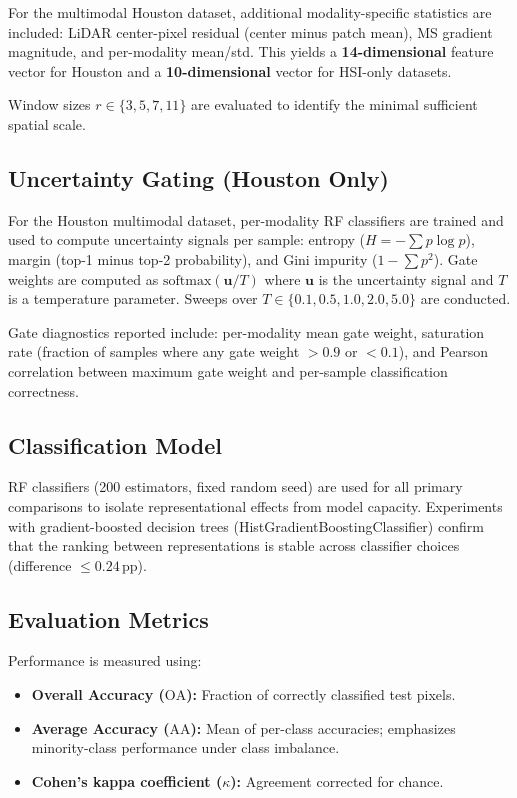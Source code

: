 \documentclass[journal]{IEEEtran}
\newcommand{\pp}{\,\text{pp}}
\newcommand{\OA}{\ensuremath{\mathrm{OA}}}
\newcommand{\Acc}{\ensuremath{\mathrm{AA}}}  %
\begin{document}
For the multimodal Houston dataset, additional modality-specific
statistics are included: LiDAR center-pixel residual (center minus
patch mean), MS gradient magnitude, and per-modality mean/std. This
yields a \textbf{14-dimensional} feature vector for Houston and a
\textbf{10-dimensional} vector for HSI-only datasets.

Window sizes $r \in \{3, 5, 7, 11\}$ are evaluated to identify the
minimal sufficient spatial scale.

\subsection{Uncertainty Gating (Houston Only)}

For the Houston multimodal dataset, per-modality RF classifiers are
trained and used to compute uncertainty signals per sample: entropy
($H = -\sum p \log p$), margin (top-1 minus top-2 probability), and
Gini impurity ($1 - \sum p^2$). Gate weights are computed as
$\mathrm{softmax}(\mathbf{u}/T)$ where $\mathbf{u}$ is the
uncertainty signal and $T$ is a temperature parameter. Sweeps over
$T \in \{0.1, 0.5, 1.0, 2.0, 5.0\}$ are conducted.

Gate diagnostics reported include: per-modality mean gate weight,
saturation rate (fraction of samples where any gate weight $> 0.9$
or $< 0.1$), and Pearson correlation between maximum gate weight
and per-sample classification correctness.

\subsection{Classification Model}

RF classifiers (200 estimators, fixed random seed) are used for all
primary comparisons to isolate representational effects from model
capacity. Experiments with gradient-boosted decision trees
(HistGradientBoostingClassifier) confirm that the ranking between
representations is stable across classifier choices
(difference $\leq 0.24\pp$).

\subsection{Evaluation Metrics}

Performance is measured using:
\begin{itemize}
  \item \textbf{Overall Accuracy (\OA):} Fraction of correctly
    classified test pixels.
  \item \textbf{Average Accuracy (\Acc):} Mean of per-class
    accuracies; emphasizes minority-class performance under class
    imbalance.
  \item \textbf{Cohen's kappa coefficient ($\kappa$):} Agreement
    corrected for chance.
\end{itemize}
\end{document}
